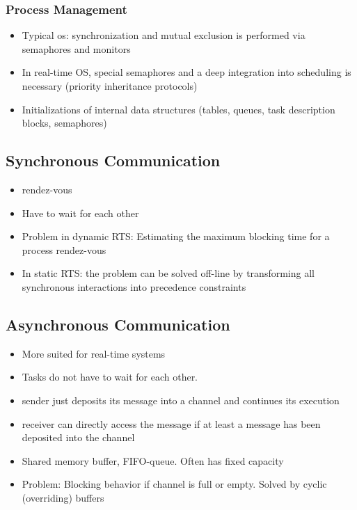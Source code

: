 \subsubsection{Process Management}
\begin{itemize}[noitemsep]
\item Typical os: synchronization and mutual exclusion is performed via semaphores and monitors
\item In real-time OS, special semaphores and a deep integration into scheduling is necessary (priority inheritance protocols)
\item Initializations of internal data structures (tables, queues, task description blocks, semaphores)
\end{itemize}


\subsection{Synchronous Communication}
\begin{itemize}[noitemsep]
\item rendez-vous
\item Have to wait for each other
\item Problem in dynamic RTS: Estimating the maximum blocking time for a process rendez-vous
\item In static RTS: the problem can be solved off-line by transforming all synchronous interactions into precedence constraints
\end{itemize}

\subsection{Asynchronous Communication}
\begin{itemize}[noitemsep]
\item More suited for real-time systems
\item Tasks do not have to wait for each other.
\item sender just deposits its message into a channel and continues its execution
\item receiver can directly access the message if at least a message has been deposited into the channel
\item Shared memory buffer, FIFO-queue. Often has fixed capacity
\item Problem: Blocking behavior if channel is full or empty. Solved by cyclic (overriding) buffers
\end{itemize}

